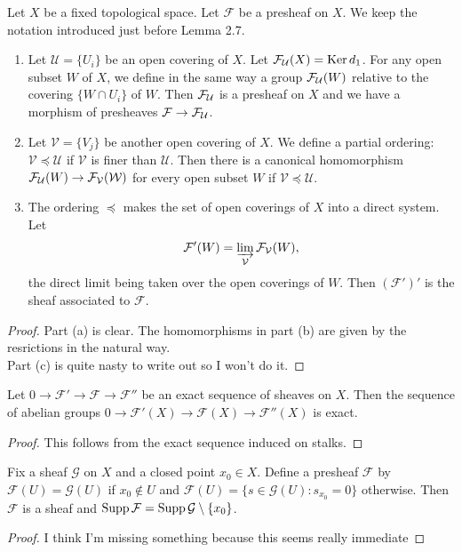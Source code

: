 \begin{exer}
	Let $X$ be a fixed topological space. Let $\mathcal F$ be a presheaf on
	$X$. We keep the notation introduced just before Lemma 2.7.
	\begin{enumerate}[label=(\alph*)]
		\item Let $\mathcal U = \{ U_i \}$ be an open covering of $X$.
			Let ${\cal F_U}(X) = \operatorname{Ker} d_1$. For any open subset $W$
			of $X$, we define in the same way a group
			${\cal F_U}(W)$ relative to the covering
			$\{ W \cap U_i \}$ of $W$. Then ${\cal F_U}$ is a
			presheaf on $X$ and we have a morphism of presheaves
			$\mathcal F \to {\cal F_U}$.
		\item Let $\mathcal V = \{ V_j \}$ be another open covering of
			$X$. We define a partial ordering: $\mathcal V \preceq
			\mathcal U$ if $\mathcal V$ is finer than $\mathcal U$.
			Then there is a canonical homomorphism ${\cal F_U}(W)
			\to {\cal F_V(W)}$ for every open subset $W$ if
			$\mathcal V \preceq \mathcal U$.
		\item The ordering $\preceq$ makes the set of open coverings of
			$X$ into a direct system. Let
			\[
				\mathcal F'(W) =
					\varinjlim_{\mathcal V} {\cal F_V}(W),
			\]
			the direct limit being taken over the open coverings of
			$W$. Then $(\mathcal F')'$ is the sheaf associated to
			$\mathcal F$.
	\end{enumerate}
\end{exer}
\begin{proof}
	Part (a) is clear. The homomorphisms in part (b) are given by the
	resrictions in the natural way.\\

	Part (c) is quite nasty to write out so I won't do it.
\end{proof}

\begin{exer}
	Let $0 \to \mathcal F' \to \mathcal F \to \mathcal F''$ be an exact
	sequence of sheaves on $X$. Then the sequence of abelian groups
	$0 \to \mathcal F'(X) \to \mathcal F(X) \to \mathcal F''(X)$ is exact.
\end{exer}
\begin{proof}
	This follows from the exact sequence induced on stalks.
\end{proof}

\begin{exer}
	Fix a sheaf $\mathcal G$ on $X$ and a closed
	point $x_0 \in X$. Define a presheaf $\mathcal F$ by $\mathcal F(U) =
	\mathcal G(U)$ if $x_0 \not\in U$ and $\mathcal F(U) = \{ s \in
	\mathcal G(U) : s_{x_0} = 0 \}$ otherwise. Then $\mathcal F$ is a sheaf
	and $\operatorname{Supp} \mathcal F = \operatorname{Supp} \mathcal G \setminus \{ x_0 \}$.
\end{exer}
\begin{proof}
	I think I'm missing something because this seems really immediate
\end{proof}

